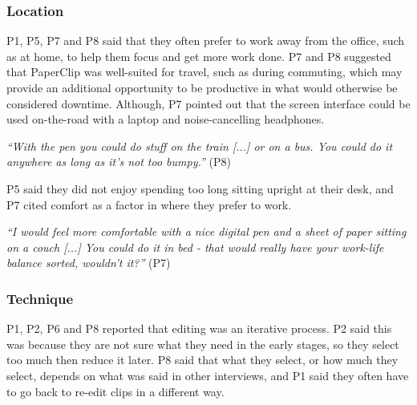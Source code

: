 
\subsubsection{Location}
P1, P5, P7 and P8 said that they often prefer to work away from the office, such as at home, to help them focus and get
more work done.  P7 and P8 suggested that PaperClip was well-suited for travel, such as during commuting, which
may provide an additional opportunity to be productive in what would otherwise be considered downtime.  Although, P7
pointed out that the screen interface could be used on-the-road with a laptop and noise-cancelling headphones. 


\textit{``With the pen you could do stuff on the train [...]
or on a bus. You could do it anywhere as long as it's not too bumpy.''} (P8)

P5 said they did not enjoy spending too long sitting upright at their
desk, and P7 cited comfort as a factor in where they prefer to work.

\textit{``I would feel more comfortable with a nice digital pen and a sheet of paper sitting on a couch [...]
  You could do it in bed - that would really have your work-life balance sorted, wouldn't it?''} (P7)

\subsubsection{Technique}
P1, P2, P6 and P8 reported that editing was an iterative process. P2 said this was because they are not sure what they
need in the early stages, so they select too much then reduce it later. P8 said that what they select, or how much they
select, depends on what was said in other interviews, and P1 said they often have to go back to re-edit clips in a
different way. 

